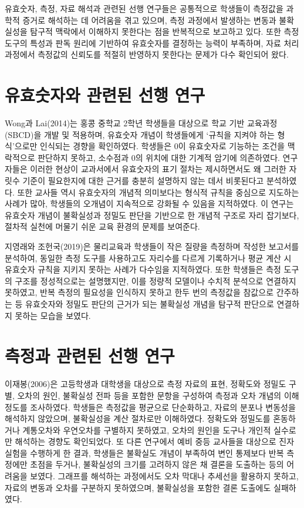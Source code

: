 유효숫자, 측정, 자료 해석과 관련된 선행 연구들은 공통적으로 학생들이 측정값을 과학적 증거로
해석하는 데 어려움을 겪고 있으며, 측정 과정에서 발생하는 변동과 불확실성을 탐구적 맥락에서
이해하지 못한다는 점을 반복적으로 보고하고 있다.
%
또한 측정 도구의 특성과 판독 원리에 기반하여 유효숫자를 결정하는 능력이 부족하며,
자료 처리 과정에서 측정값의 신뢰도를 적절히 반영하지 못한다는 문제가 다수 확인되어 왔다. \\

\section{유효숫자와 관련된 선행 연구}

Wong과 Lai(2014)는 홍콩 중학교 2학년 학생들을 대상으로 학교 기반 교육과정(SBCD)을
개발 및 적용하며, 유효숫자 개념이 학생들에게 `규칙을 지켜야 하는 형식'으로만 인식되는
경향을 확인하였다. 학생들은 0이 유효숫자로 기능하는 조건을 맥락적으로 판단하지 못하고,
소수점과 0의 위치에 대한 기계적 암기에 의존하였다.
%
연구자들은 이러한 현상이 교과서에서 유효숫자의 표기 절차는 제시하면서도 왜 그러한 자릿수 기준이
필요한지에 대한 근거를 충분히 설명하지 않는 데서 비롯된다고 분석하였다.
%
또한 교사들 역시 유효숫자의 개념적 의미보다는 형식적 규칙을 중심으로 지도하는 사례가 많아,
학생들의 오개념이 지속적으로 강화될 수 있음을 지적하였다.
%
이 연구는 유효숫자 개념이 불확실성과 정밀도 판단을 기반으로 한 개념적 구조로 자리 잡기보다,
절차적 실천에 머물기 쉬운 교육 환경의 문제를 보여준다.

지영래와 조헌국(2019)은 물리교육과 학생들이 작은 질량을 측정하며 작성한 보고서를 분석하여,
동일한 측정 도구를 사용하고도 자리수를 다르게 기록하거나 평균 계산 시 유효숫자 규칙을 지키지
못하는 사례가 다수임을 지적하였다.
%
또한 학생들은 측정 도구의 구조를 정성적으로는 설명했지만, 이를 정량적 모델이나 수치적 분석으로
연결하지 못하였고, 반복 측정의 필요성을 인식하지 못하고 한두 번의 측정값을 참값으로 간주하는 등
유효숫자와 정밀도 판단의 근거가 되는 불확실성 개념을 탐구적 판단으로 연결하지 못하는 모습을 보였다. \\

\section{측정과 관련된 선행 연구}

이재봉(2006)은 고등학생과 대학생을 대상으로 측정 자료의 표현, 정확도와 정밀도 구별,
오차의 원인, 불확실성 전파 등을 포함한 문항을 구성하여 측정과 오차 개념의 이해 정도를 조사하였다.
학생들은 측정값을 평균으로 단순화하고, 자료의 분포나 변동성을 해석하지 않았으며,
불확실성을 계산 절차로만 이해하였다.
정확도와 정밀도를 혼동하거나 계통오차와 우연오차를 구별하지 못하였고,
오차의 원인을 도구나 개인적 실수로만 해석하는 경향도 확인되었다.
%
또 다른 연구에서 예비 중등 교사들을 대상으로 진자 실험을 수행하게 한 결과,
학생들은 불확실도 개념이 부족하여 변인 통제보다 반복 측정에만 초점을 두거나,
불확실성의 크기를 고려하지 않은 채 결론을 도출하는 등의 어려움을 보였다.
그래프를 해석하는 과정에서도 오차 막대나 추세선을 활용하지 못하고,
자료의 변동과 오차를 구분하지 못하였으며, 불확실성을 포함한 결론 도출에도 실패하였다.

